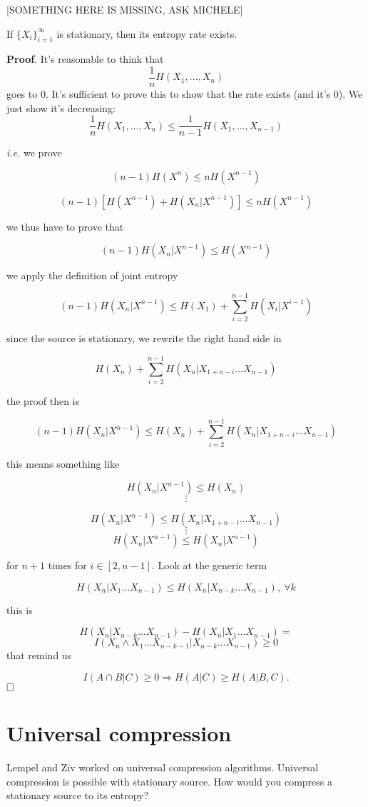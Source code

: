 [SOMETHING HERE IS MISSING, ASK MICHELE]

\begin{thm}
 If $\{X_i\}_{i = 1}^\infty$ is stationary, then its entropy rate exists.
\end{thm}

\noindent\textbf{Proof}. It's reasonable to think that $$\dfrac{1}{n}H(X_1, \ldots, X_n)$$ goes to 0. It's sufficient to prove this to show that the rate exists (and it's 0). We just show it's decreasing:
\[
 \dfrac{1}{n}H(X_1, \ldots, X_n)  \leq \dfrac{1}{n-1}H(X_1, \ldots, X_{n-1}) 
\]

\emph{i.e.} we prove

\[
 (n-1)H(X^n)  \leq nH(X^{n-1}) 
\]

\[
 (n-1)[H(X^{n-1}) + H(X_n | X^{n-1})]  \leq nH(X^{n-1}) 
\]

we thus have to prove that

\[
  (n-1)H(X_n | X^{n-1})  \leq H(X^{n-1}) 
\]

we apply the definition of joint entropy

\[
 (n-1)H(X_n | X^{n-1})  \leq H(X_1) + \sum_{i=2}^{n-1}H(X_i|X^{i-1}) 
\]

since the source is stationary, we rewrite the right hand side in

\[
 H(X_n) + \sum_{i=2}^{n-1} H(X_n|X_{1 + n - i} \ldots X_{n-1})
\]

the proof then is

\[
(n-1)H(X_n|X^{n-1}) \leq H(X_n) + \sum_{i=2}^{n-1}H(X_n | X_{1+n-i} \ldots X_{n-1}) 
\]

this means something like

\[
 H(X_n|X^{n-1}) \leq H(X_n)
\]
\[
 \vdots
\]

\[
 H(X_n|X^{n-1}) \leq H(X_n | X_{1+n-i} \ldots X_{n-1}) 
\]
\[
 \vdots
\]
\[
 H(X_n|X^{n-1}) \leq H(X_n|X^{n-1})
\]

for $n+1$ times for $i \in [2, n-1]$. Look at the generic term

\[
 H(X_n|X_1 \ldots X_{n-1}) \leq H(X_n|X_{n-k}\ldots X_{n-1}),\ \forall k
\]

this is

\[
 H(X_n | X_{n-k} \ldots X_{n-1}) -H(X_n|X_1\ldots X_{n-1}) =
\]
\[
 I(X_n \wedge X_1 \ldots X_{n-k-1} | X_{n-k} \ldots X_{n-1}) \geq 0
\]
that remind us

\[
 I(A \cap B | C) \geq 0 \Rightarrow H(A|C) \geq H(A | B,C).
\]
$ \hfill\Box$

\section{Universal compression}
Lempel and Ziv worked on universal compression algorithms. Universal compression is possible with stationary source. How would you compress a stationary source to its entropy?


